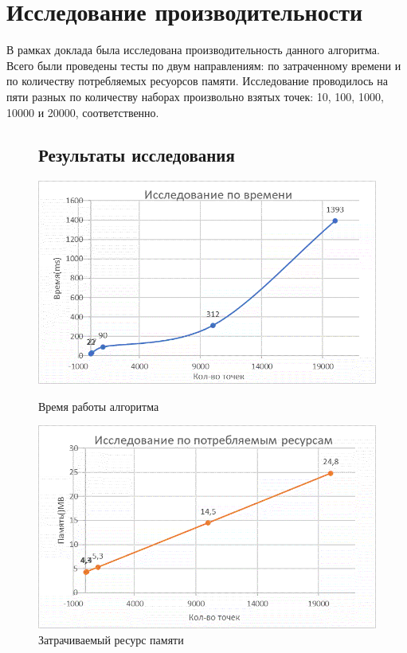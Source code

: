 \documentclass[ a4paper]{article}
\begin{document}
\newpage

\section{Исследование производительности}
В рамках доклада была исследована производительность данного алгоритма. Всего были проведены тесты по двум направлениям: по затраченному времени и по количеству потребляемых ресуорсов памяти. Исследование проводилось на пяти разных по количеству наборах произвольно взятых точек: 10, 100, 1000, 10000 и 20000, соответственно.


\begin{figure}[H]
\subsection{Результаты исследования}
\centering
\includegraphics[scale=0.9]{time}
\caption{\label{tab:widgets}Время работы алгоритма}
\bigskip
\bigskip
\bigskip
\includegraphics[scale=0.9]{resource}
\caption{\label{tab:widgets}Затрачиваемый ресурс памяти}

\end{figure}
\end{document}
